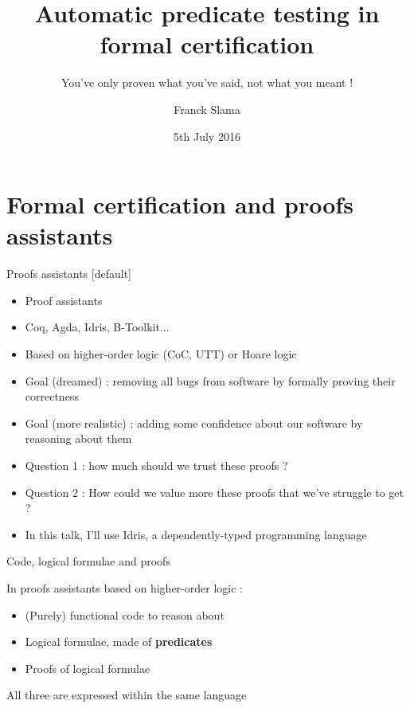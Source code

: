 \documentclass[french]{beamer}
\title{Automatic predicate testing in formal certification}
\subtitle{You've only proven what you've said, not what you meant !}
\author[Franck Slama]{Franck Slama}
\date{5th July 2016}
\institute[]{University of St Andrews - Scotland - United Kingdom}
\begin{document}
\begin{frame}
	\titlepage
\end{frame}



\section{Formal certification and proofs assistants}
\begin{frame}{Proofs assistants}
[default]
	\begin{itemize}
		\item Proof assistants
		\item Coq, Agda, Idris, B-Toolkit...
		\item Based on higher-order logic (CoC, UTT) or Hoare logic
		\item Goal (dreamed) : removing all bugs from software by formally proving their correctness
		\item Goal (more realistic) : adding some confidence about our software by reasoning about them
		\pause \item Question 1 : how much should we trust these proofs ?
		\pause \item Question 2 : How could we value more these proofs that we've struggle to get ?
		\pause \item In this talk, I'll use Idris, a dependently-typed programming language
	\end{itemize}
\end{frame}


\begin{frame}{Code, logical formulae and proofs}

	In proofs assistants based on higher-order logic :
	\begin{itemize}
		\item (Purely) functional code to reason about
		\item Logical formulae, made of \textbf{predicates}
		\item Proofs of logical formulae
	\end{itemize}

	All three are expressed within the same language

\end {frame}
\end{document}
